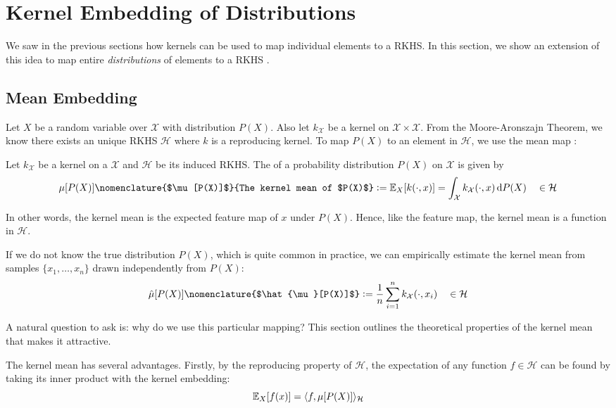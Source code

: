 \section{Kernel Embedding of Distributions}
We saw in the previous sections how kernels can be used to map individual elements to a RKHS. In this section, we show an extension of this idea to map entire \emph{distributions} of elements to a RKHS \citep{smola2007hilbert}.

\subsection{Mean Embedding}
Let $X$ be a random variable over $\mathcal{X}$ with distribution $P(X)$. Also let $k_\mathcal{X}$ be a kernel on $\mathcal{X} \times \mathcal{X}$. From the Moore-Aronszajn Theorem, we know there exists an unique RKHS $\mathcal{H}$ where $k$ is a reproducing kernel. To map $P(X)$ to an element in $\mathcal{H}$, we use the mean map :
%
\begin{definition}
Let $k_\mathcal{X}$ be a kernel on a  $\mathcal{X}$ and $\mathcal{H}$ be its induced RKHS. The  of a probability distribution $P(X)$ on $\mathcal{X}$ is given by \citep{smola2007hilbert}
%
\begin{equation}
  \mu[P(X)]\nomenclature{$\mu[P(X)]$}{The kernel mean of $P(X)$} \defeq \E_X[k(\cdot, x)] = \int_\mathcal{X} k_\mathcal{X}(\cdot, x) \,\mathrm{d}P(X) \quad\in \mathcal{H}
\end{equation}
\end{definition}
%
In other words, the kernel mean is the expected feature map of $x$ under $P(X)$. Hence, like the feature map, the kernel mean is a function in $\mathcal{H}$.

If we do not know the true distribution $P(X)$, which is quite common in practice, we can empirically estimate the kernel mean from samples $\{ x_1, \dotsc, x_n \}$ drawn independently from $P(X)$:
%
\begin{equation}
   \hat{\mu}[P(X)]\nomenclature{$\hat{\mu}[P(X)]$} \defeq \frac{1}{n} \sum_{i=1}^n k_\mathcal{X}(\cdot, x_i) \quad\in \mathcal{H}
\end{equation}

A natural question to ask is: why do we use this particular mapping? This section outlines the theoretical properties of the kernel mean that makes it attractive.

The kernel mean has several advantages. Firstly, by the reproducing property of $\mathcal{H}$, the expectation of any function $f \in \mathcal{H}$ can be found by taking its inner product with the kernel embedding:
%
\begin{equation}
\mathbb{E}_X[f(x)] = \langle f, \mu[P(X)]\rangle_\mathcal{H}
\end{equation}

